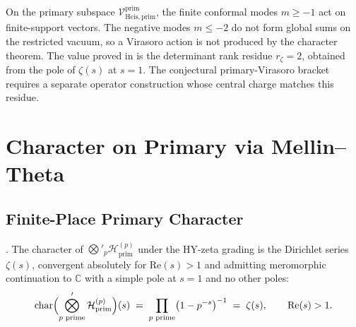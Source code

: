 \begin{remark}
\label{v4-arith:prim-zeta:rem:Virasoro-reconciliation}
On the primary subspace
\(\mathcal{V}^{\mathrm{prim}}_{\mathrm{Heis},\mathrm{prim}}\), the
finite conformal modes \(m\geq -1\) act on finite-support vectors. The
negative modes \(m\leq -2\) do not form global sums on the restricted
vacuum, so a Virasoro action is not produced by the character theorem.
The value proved in  is the
determinant rank residue \(r_{\zeta}=2\), obtained from the pole of
\(\zeta(s)\) at \(s=1\). The conjectural primary-Virasoro bracket
requires a separate operator construction whose central charge matches
this residue.
\end{remark}

\section{Character on Primary via Mellin--Theta}
\label{v4-arith:prim-zeta:character-primary}

\subsection{Finite-Place Primary Character}
\label{v4-arith:prim-zeta:finite-char}

\begin{theorem}
\label{v4-arith:prim-zeta:thm:finite-char}
\ClaimStatusProvedHere. The character of
\(\bigotimes'_{p}\mathcal{H}^{(p)}_{\mathrm{prim}}\) under the
HY-zeta grading is the Dirichlet series \(\zeta(s)\), convergent
absolutely for \(\mathrm{Re}(s)>1\) and admitting meromorphic
continuation to \(\mathbb{C}\) with a simple pole at \(s=1\) and no
other poles:
\begin{equation}
\label{v4-arith:prim-zeta:eq:finite-char}
\mathrm{char}\Bigl(\bigotimes_{p\text{ prime}}^{\prime}\mathcal{H}^{(p)}_{\mathrm{prim}}\Bigr)(s)
\;=\;\prod_{p\text{ prime}}\bigl(1-p^{-s}\bigr)^{-1}
\;=\;\zeta(s),
\qquad\mathrm{Re}(s)>1.
\end{equation}
\end{theorem}

